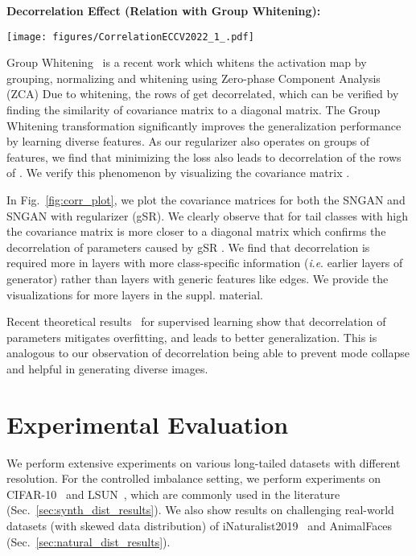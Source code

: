 \documentclass[runningheads,table]{llncs}
\newcommand{\ie}{\textit{i}.\textit{e}. }
\begin{document}
\noindent\textbf{Decorrelation Effect (Relation with Group Whitening):}
\begin{figure*}[t]    
    \centering
    \texttt{[image: figures/CorrelationECCV2022\_1\_.pdf]}
    \caption{\textbf{Covariance matrices of  for (l = 1) for SNGAN baseline.}  After using gSR (for tail classes with high ) the covariance matrix converges to a diagonal matrix in comparison to without gSR (where large correlations exist). This demonstrates the decorrelation effect of gSR on , which alleviates class-specific mode collapse.}
    \label{fig:corr_plot}
\end{figure*}
\label{sec:modecollapse}
Group Whitening~\cite{huang2021group} is a recent work which whitens the activation map  by grouping, normalizing and whitening using Zero-phase Component Analysis (ZCA)  
Due to whitening, the rows of  get decorrelated, which can be verified by finding the similarity of covariance matrix  to a diagonal matrix. The Group Whitening transformation significantly improves the generalization performance by learning diverse features. As our regularizer also operates on groups of features, we find that minimizing the  loss also leads to decorrelation of the rows of . We verify this phenomenon by visualizing the covariance matrix . 


In Fig.~\ref{fig:corr_plot}, we plot the covariance matrices for both the SNGAN and SNGAN with regularizer (gSR). We clearly observe that for tail classes with high  the covariance matrix is more closer to a diagonal matrix which confirms the decorrelation of parameters caused by gSR . 
We find that decorrelation is required more in layers with more class-specific information (\ie earlier layers of generator) rather than layers with generic features like edges. We provide the visualizations for more layers in the suppl. material. 

Recent theoretical results~\cite{wang2020mma,jin2020does} for supervised learning show that decorrelation of parameters mitigates overfitting, and leads to better generalization. This is analogous to our observation of decorrelation being able to prevent mode collapse and helpful in generating diverse images.


\section{Experimental Evaluation}
\label{sec:expts}
We perform extensive experiments on various long-tailed datasets with different resolution. For the controlled imbalance setting, we perform experiments on CIFAR-10~\cite{Krizhevsky09learningmultiple} and LSUN~\cite{journals/corr/YuZSSX15}, which are commonly used in the literature~\cite{cao2019learning, cui2019classbalancedloss, santurkar2018classification} (Sec.~\ref{sec:synth_dist_results}). We also show results on challenging real-world datasets (with skewed data distribution) of iNaturalist2019~\cite{inat19} and AnimalFaces~\cite{kolouri2016sliced} (Sec.~\ref{sec:natural_dist_results}). 
\end{document}
